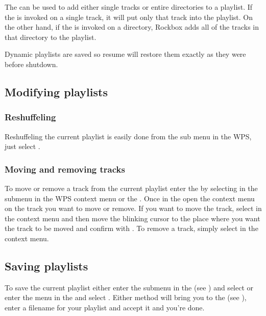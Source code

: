 The   can be used to add either single tracks or
entire directories to a playlist. If the  is
invoked on a single track, it will put only that track into the playlist.
On the other hand, if the  is invoked on a
directory, Rockbox adds all of the tracks in that directory to the
playlist.


Dynamic playlists are saved so resume will restore them exactly as they
were before shutdown.

  
\subsection{Modifying playlists}
\subsubsection{Reshuffeling}
Reshuffeling the current playlist is easily done from the 
sub menu in the WPS, just select .

\subsubsection{Moving and removing tracks}
To move or remove a track from the current playlist enter the
 by selecting  in the
 submenu in the WPS context menu or the .
Once in the  open the context menu on the track you
want to move or remove. If you want to move the track, select  in
the context menu and then move the blinking cursor to the place where you want
the track to be moved and confirm with \ActionStdOk. To remove a track, simply
select  in the context menu.

\subsection{Saving playlists}
To save the current playlist either enter the  submenu
in the  (see ) and
select  or enter the
 menu in the  and select
.
Either method will bring you to the  (see
), enter a filename for your playlist and
accept it and you're done.

